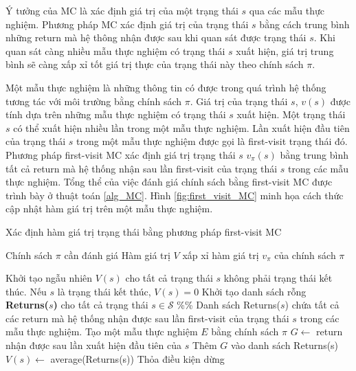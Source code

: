 Ý tưởng của MC là xác định giá trị của một trạng thái $s$ qua các mẫu thực nghiệm. Phương pháp MC xác định giá trị của trạng thái $s$ bằng cách trung bình những return mà hệ thông nhận được sau khi quan sát được trạng thái $s$. Khi quan sát càng nhiều mẫu thực nghiệm có trạng thái $s$ xuất hiện, giá trị trung bình sẽ càng xấp xỉ tốt giá trị thực của trạng thái này theo chính sách $\pi$.

Một mẫu thực nghiệm là những thông tin có được trong quá trình hệ thống tương tác với môi trường bằng chính sách $\pi$. Giá trị của trạng thái $s$, $v(s)$ được tính dựa trên những mẫu thực nghiệm có trạng thái $s$ xuất hiện. Một trạng thái $s$ có thể xuất hiện nhiều lần trong một mẫu thực nghiệm. Lần xuất hiện đầu tiên của trạng thái $s$ trong một mẫu thực nghiệm được gọi là first-visit trạng thái đó. Phương pháp first-visit MC xác định giá trị trạng thái $s$ $v_{\pi}(s)$ bằng trung bình tất cả return mà hệ thống nhận sau lần first-visit của trạng thái $s$ trong các mẫu thực nghiệm. Tổng thể của việc đánh giá chính sách bằng first-visit MC được trình bày ở thuật toán \ref{alg_MC}. Hình \ref{fig:first_visit_MC} minh họa cách thức cập nhật hàm giá trị trên một mẫu thực nghiệm.
\begin{algorithm}
	\caption{Xác định hàm giá trị trạng thái bằng phương pháp first-visit MC}
	\label{alg_MC}
	\begin{algorithmic}[1]
		\renewcommand{\algorithmicrequire}{\textbf{Đầu vào:}}
		\renewcommand{\algorithmicensure}{\textbf{Đầu ra:}}
		\algnewcommand{}
		\algnewcommand\Operation{\item[\algorithmicoperation]}
		
		\Require Chính sách $\pi$ cần đánh giá
		\Ensure Hàm giá trị $V$ xấp xỉ hàm giá trị $v_{\pi}$ của chính sách $\pi$
		
		\Operation
		\State Khởi tạo ngẫu nhiên $V(s)$ cho tất cả trạng thái $s$ không phải trạng thái kết thúc. Nếu $s$ là trạng thái kết thúc, $V(s) = 0$
		\State Khởi tạo danh sách rỗng \textbf{Returns($s$)} cho tất cả trạng thái $s \in \mathcal{S}$ \%\% Danh sách Returns($s$) chứa tất cả các return mà hệ thống nhận được sau lần first-visit của trạng thái $s$ trong các mẫu thực nghiệm.
		\Repeat
		\State Tạo một mẫu thực nghiệm $E$ bằng chính sách $\pi$
		\State $G \leftarrow$ return nhận được sau lần xuất hiện đầu tiên của $s$
		\State Thêm $G$ vào danh sách Returns(s)
		\State $V(s) \leftarrow$ average(Returns(s))
		\EndFor
		\Until Thỏa điều kiện dừng
	\end{algorithmic}
\end{algorithm}
